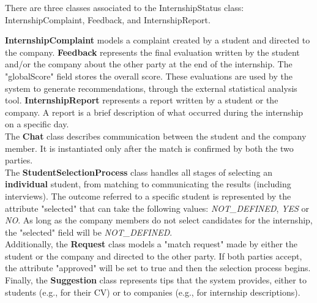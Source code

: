 There are three classes associated to the InternshipStatus class: InternshipComplaint, Feedback, and InternshipReport.

\textbf{InternshipComplaint} models a complaint created by a student and directed to the company.
\textbf{Feedback} represents the final evaluation written by the student and/or the company about the other party at the end of the internship.
The "globalScore" field stores the overall score. These evaluations are used by the system to generate recommendations, through the external statistical analysis tool.
\textbf{InternshipReport} represents a report written by a student or the company. A report is a brief description of what occurred during the internship on a specific day.\\

The \textbf{Chat} class describes communication between the student and the company member. It is instantiated only after the match is confirmed by both the two parties.\\

The \textbf{StudentSelectionProcess} class handles all stages of selecting an \textbf{individual} student, from matching to communicating the results (including interviews). The outcome referred
to a specific student is represented by the attribute "selected" that can take the following values: \textit{NOT\_DEFINED}, \textit{YES} or \textit{NO}. As long as the company members do not select candidates for the internship, the "selected" field will be \textit{NOT\_DEFINED}.\\

Additionally, the \textbf{Request} class models a "match request" made by either the student or the company and directed to the other party.
If both parties accept, the attribute "approved" will be set to true and then the selection process begins.\\

Finally, the \textbf{Suggestion} class represents tips that the system provides, either to students (e.g., for their CV) or to companies (e.g., for internship descriptions).

